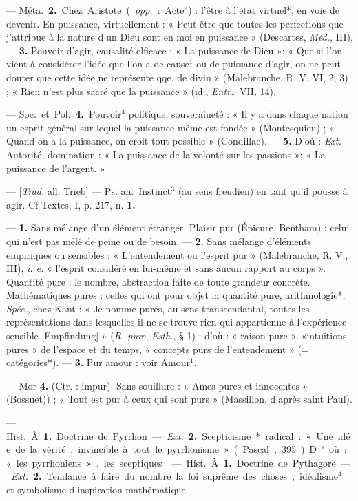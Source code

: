 \begin{itemize}[leftmargin=1cm, label=, itemsep=1pt]
— \si{Méta.} {\bf 2.} Chez Aristote ({\it opp.} :
Acte$^2$) : l'être à l’état virtuel*, en
voie de devenir. En puissance, virtuellement : « Peut-être que toutes
les perfections que j'attribue à la
nature d'un Dieu sont en moi en
puissance » (Descartes, \si{{\it Méd.}}, III),
— {\bf 3.} Pouvoir d'agir, causalité elficace : « La puissance de Dieu »:
« Que si l’on vient à considérer l’idée
que l'on a de cause$^1$ ou de puissance
d'agir, on ne peut douter que cette
idée ne représente qqe. de divin »
(Malebranche, R. V. VI, 2, 3) ;
« Rien n'est plus sacré que la puissance » (id., {\it Entr.}, VII, 14).

— \si{Soc.} et \si{Pol.} {\bf 4.} Pouvoir$^4$ politique, souveraineté : « Il y a dans
chaque nation un esprit général sur
lequel la puissance même est fondée »
(Montesquieu) ; « Quand on a la
puissance, on croit tout possible »
(Condillac). — {\bf 5.} D'où : {\it Ext.} Autorité, domination : « La puissance de
la volonté sur les passions »; « La
puissance de l'argent. »

 — [{\it Trad.} all. Trieb] — \si{Ps. an.}
Instinct$^3$ (au sens freudien) en tant
qu'il pousse à agir. Cf Textes, I,
p. 217, n. {\bf 1.}

 — {\bf 1.} Sans mélange d’un élément
étranger. Plaisir pur (Épicure, Bentham) : celui qui n’est pas mêlé de
peine ou de besoin. — {\bf 2.} Sans mélange d’éléments empiriques ou
sensibles : « L’entendement ou l’esprit pur » (Malebranche, R. V., III),
{\it i. e.} « l'esprit considéré en lui-même
et sans aucun rapport au corps ».
Quantité pure : le nombre, abstraction faite de toute grandeur concrète. Mathématiques pures : celles
qui ont pour objet la quantité pure,
arithmologie*, {\it Spéc.}, chez Kant :
« Je nomme pures, au sens transcendantal, toutes les représentations dans lesquelles il ne se trouve
rien qui appartienne à l'expérience
sensible [Empfindung] » ({\it R. pure},
{\it Esth.}, § 1) ; d’où : « raison pure »,
«intuitions pures » de l'espace et du
temps, « concepts purs de l’entendement » (= catégories*). — {\bf 3.} Pur
amour : voir Amour$^1$.

— Mor {\bf 4.} (Ctr. : impur). Sans
souillure : « Ames pures et innocentes » (Bossuet)) ; « Tout est pur
à ceux qui sont purs » (Massillon,
d’après saint Paul).

 — \si{Hist.} À. {\bf 1.} Doctrine
de Pyrrhon. — {\it Ext.} {\bf 2.} Scepticisme*
radical : « Une idée de la vérité,
invincible à tout le pyrrhonisme »
(Pascal, 395). D'où : « les pyrrhoniens », les sceptiques.

 — \si{Hist.} À. {\bf 1.} Doctrine
de Pythagore. — {\it Ext.} {\bf 2.} Tendance
à faire du nombre la loi suprême des
choses, idéalisme$^4$ et symbolisme
d'inspiration mathématique.

	\end{itemize}
